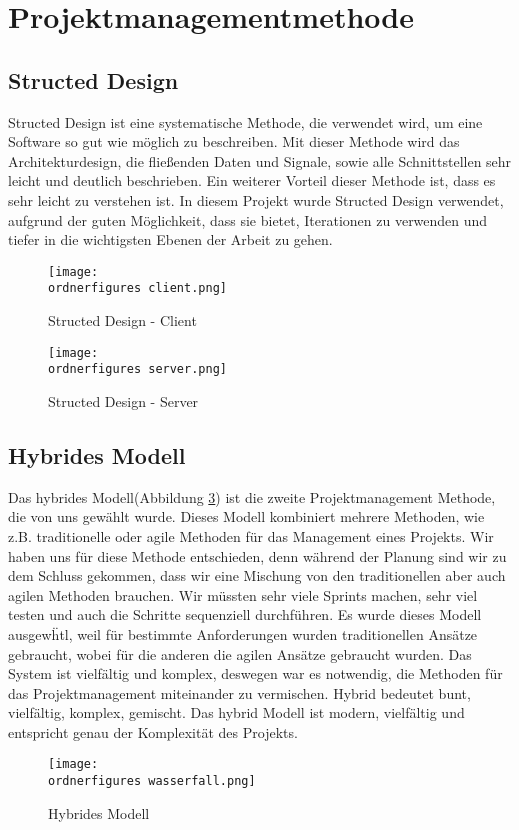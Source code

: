 \section{Projektmanagementmethode}

\subsection{Structed Design}
Structed Design ist eine systematische Methode, die verwendet wird, um eine Software so gut wie m\"{o}glich zu beschreiben. Mit dieser Methode wird das Architekturdesign, die flie\ss{}enden Daten und Signale, sowie alle Schnittstellen sehr leicht und deutlich beschrieben. Ein weiterer Vorteil dieser Methode ist, dass es sehr leicht zu verstehen ist. In diesem Projekt wurde Structed Design verwendet, aufgrund der guten M\"{o}glichkeit, dass sie bietet, Iterationen zu verwenden und tiefer in die wichtigsten Ebenen der Arbeit zu gehen. 



\begin{figure}[ht]
	\centering
	\texttt{[image: \\ordnerfigures
		client.png]}
	\caption{Structed Design - Client}
	\label{fi:sd-client}
\end{figure}



\begin{figure}[ht]
	
	\centering
	\texttt{[image: \\ordnerfigures
		server.png]}
	\caption{Structed Design - Server}
	\label{fi:sd-server}
\end{figure}


\subsection{Hybrides Modell}
Das hybrides Modell(Abbildung \ref{fi:hybrides}) ist die zweite Projektmanagement Methode, die von uns gew\"ahlt wurde. Dieses Modell kombiniert mehrere Methoden, wie z.B. traditionelle oder agile Methoden f\"ur das Management eines Projekts. Wir haben uns für diese Methode entschieden, denn während der Planung sind wir zu dem Schluss gekommen, dass wir eine Mischung von den traditionellen aber auch agilen Methoden brauchen. Wir müssten sehr viele Sprints machen, sehr viel testen und auch die Schritte sequenziell durchführen. Es wurde dieses Modell ausgew\"htl, weil f\"ur bestimmte Anforderungen wurden traditionellen Ans\"atze gebraucht, wobei f\"ur die anderen die agilen Ans\"atze gebraucht wurden.  Das System ist vielf\"altig und komplex, deswegen war es notwendig, die Methoden f\"ur das Projektmanagement miteinander zu vermischen. Hybrid bedeutet bunt, vielf\"altig, komplex, gemischt. Das hybrid Modell ist modern, vielfältig und entspricht genau der Komplexität des Projekts.



\begin{figure}[h]
	\centering
	\texttt{[image: \\ordnerfigures
		wasserfall.png]}
	\caption{Hybrides Modell}
	\label{fi:hybrides}
\end{figure}



